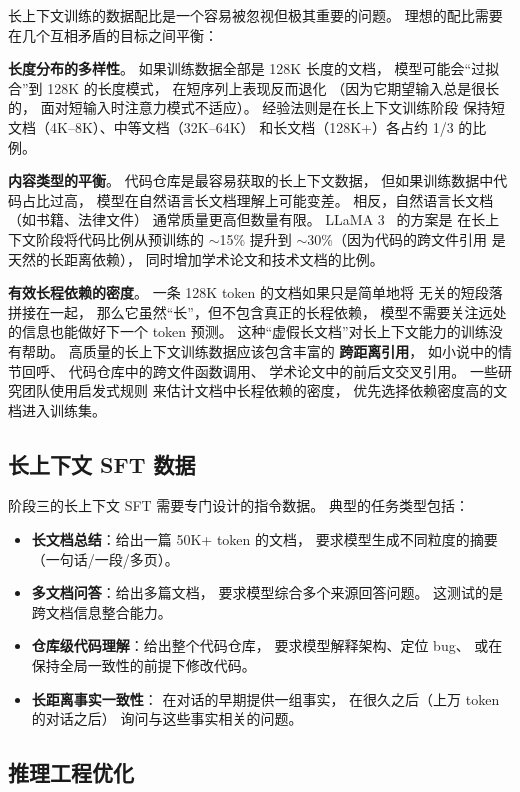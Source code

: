 长上下文训练的数据配比是一个容易被忽视但极其重要的问题。
理想的配比需要在几个互相矛盾的目标之间平衡：

\textbf{长度分布的多样性}。
如果训练数据全部是 128K 长度的文档，
模型可能会“过拟合”到 128K 的长度模式，
在短序列上表现反而退化
（因为它期望输入总是很长的，
面对短输入时注意力模式不适应）。
经验法则是在长上下文训练阶段
保持短文档（4K--8K）、中等文档（32K--64K）
和长文档（128K+）各占约 1/3 的比例。

\textbf{内容类型的平衡}。
代码仓库是最容易获取的长上下文数据，
但如果训练数据中代码占比过高，
模型在自然语言长文档理解上可能变差。
相反，自然语言长文档（如书籍、法律文件）
通常质量更高但数量有限。
LLaMA 3~\cite{dubey2024llama3} 的方案是
在长上下文阶段将代码比例从预训练的 $\sim$15\%
提升到 $\sim$30\%（因为代码的跨文件引用
是天然的长距离依赖），
同时增加学术论文和技术文档的比例。

\textbf{有效长程依赖的密度}。
一条 128K token 的文档如果只是简单地将
无关的短段落拼接在一起，
那么它虽然“长”，但不包含真正的长程依赖，
模型不需要关注远处的信息也能做好下一个 token 预测。
这种“虚假长文档”对长上下文能力的训练没有帮助。
高质量的长上下文训练数据应该包含丰富的
\textbf{跨距离引用}，
如小说中的情节回呼、
代码仓库中的跨文件函数调用、
学术论文中的前后文交叉引用。
一些研究团队使用启发式规则
来估计文档中长程依赖的密度，
优先选择依赖密度高的文档进入训练集。

\subsection{长上下文 SFT 数据}

阶段三的长上下文 SFT 需要专门设计的指令数据。
典型的任务类型包括：
\begin{itemize}[noitemsep]
  \item \textbf{长文档总结}：给出一篇 50K+ token 的文档，
        要求模型生成不同粒度的摘要（一句话/一段/多页）。
  \item \textbf{多文档问答}：给出多篇文档，
        要求模型综合多个来源回答问题。
        这测试的是跨文档信息整合能力。
  \item \textbf{仓库级代码理解}：给出整个代码仓库，
        要求模型解释架构、定位 bug、
        或在保持全局一致性的前提下修改代码。
  \item \textbf{长距离事实一致性}：
        在对话的早期提供一组事实，
        在很久之后（上万 token 的对话之后）
        询问与这些事实相关的问题。
\end{itemize}

\subsection{推理工程优化}


